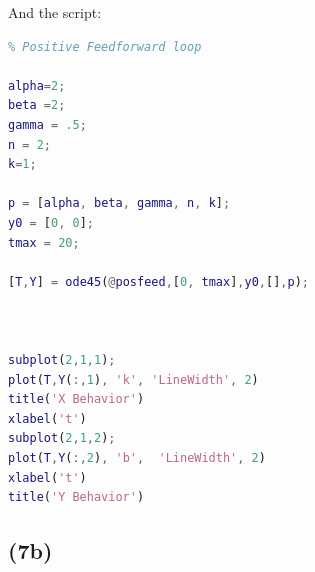 \documentclass{article}
\begin{document}
And the script:
\begin{lstlisting}[language=Matlab]
% Simulate the repressilator model
% Positive Feedforward loop

alpha=2;
beta =2;
gamma = .5;
n = 2;
k=1;

p = [alpha, beta, gamma, n, k];
y0 = [0, 0];
tmax = 20;

[T,Y] = ode45(@posfeed,[0, tmax],y0,[],p);



subplot(2,1,1);
plot(T,Y(:,1), 'k', 'LineWidth', 2)
title('X Behavior')
xlabel('t')
subplot(2,1,2);
plot(T,Y(:,2), 'b',  'LineWidth', 2)
xlabel('t')
title('Y Behavior')
\end{lstlisting}
\subsection*{\textbf{(7b)}}
\end{document}
